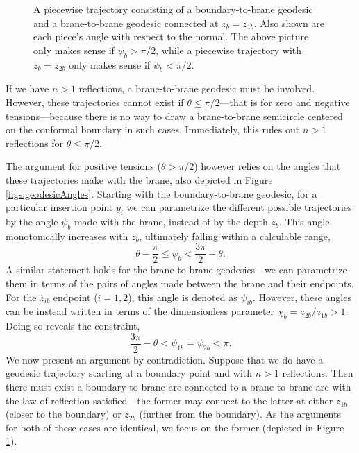 \documentclass[reprint,amsmath,amssymb,aps,nofootinbib,twocolumn]{revtex4-2}
\begin{document}
\begin{appendix}
\begin{figure}
\caption{A piecewise trajectory consisting of a boundary-to-brane geodesic and a brane-to-brane geodesic connected at $z_b = z_{1b}$. Also shown are each piece's angle with respect to the normal. The above picture only makes sense if $\psi_b > \pi/2$, while a piecewise trajectory with $z_b = z_{2b}$ only makes sense if $\psi_b < \pi/2$.}
\label{figs:2reflections}
\end{figure}



If we have $n > 1$ reflections, a brane-to-brane geodesic must be involved. However, these trajectories cannot exist if $\theta \leq \pi/2$---that is for zero and negative tensions---because there is no way to draw a brane-to-brane semicircle centered on the conformal boundary in such cases. Immediately, this rules out $n > 1$ reflections for $\theta \leq \pi/2$.

The argument for positive tensions ($\theta > \pi/2$) however relies on the angles that these trajectories make with the brane, also depicted in Figure \ref{figs:geodesicAngles}. Starting with the boundary-to-brane geodesic, for a particular insertion point $y_i$ we can parametrize the different possible trajectories by the angle $\psi_b$ made with the brane, instead of by the depth $z_b$. This angle monotonically increases with $z_b$, ultimately falling within a calculable range,
\begin{equation}
\theta - \frac{\pi}{2} \leq \psi_b < \frac{3\pi}{2} - \theta.\label{rangeBdry}
\end{equation}
A similar statement holds for the brane-to-brane geodesics---we can parametrize them in terms of the pairs of angles made between the brane and their endpoints. For the $z_{ib}$ endpoint ($i = 1,2$), this angle is denoted as $\psi_{ib}$. However, these angles can be instead written in terms of the dimensionless parameter $\chi_b = z_{2b}/z_{1b} > 1$. Doing so reveals the constraint,
\begin{equation}
\frac{3\pi}{2} - \theta < \psi_{1b} = \psi_{2b} < \pi.\label{rangeBrane}
\end{equation}
We now present an argument by contradiction. Suppose that we do have a geodesic trajectory starting at a boundary point and with $n > 1$ reflections. Then there must exist a boundary-to-brane arc connected to a brane-to-brane arc with the law of reflection satisfied---the former may connect to the latter at either $z_{1b}$ (closer to the boundary) or $z_{2b}$ (further from the boundary). As the arguments for both of these cases are identical, we focus on the former (depicted in Figure \ref{figs:2reflections}).


\end{appendix}
\end{document}
